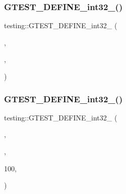 \mbox{\label{namespacetesting_aae6f1140f03d7bf24067df0f6628e9ea}} 
\subsubsection{\texorpdfstring{GTEST\_DEFINE\_int32\_()}{GTEST\_DEFINE\_int32\_()}\hspace{0.1cm}{\footnotesize\ttfamily [2/3]}}
{\footnotesize\ttfamily testing\+::\+G\+T\+E\+S\+T\+\_\+\+D\+E\+F\+I\+N\+E\+\_\+int32\+\_\+ (\begin{DoxyParamCaption}\item[{repeat}]{,  }\item[{\mbox{\hyperlink{namespacetesting_1_1internal_a0f7e728793f9e6cb0aa2b69eaa468bf3}{internal\+::\+Int32\+From\+G\+Test\+Env}}(\char`\"{}repeat\char`\"{}, 1)}]{,  }\item[{\char`\"{}How many times to repeat each test. Specify a negative number \char`\"{} \char`\"{}for repeating forever. Useful for shaking out flaky tests.\char`\"{}}]{ }\end{DoxyParamCaption})}

\mbox{\label{namespacetesting_a84af642630c9181f00fcf0a4a63e795e}} 
\subsubsection{\texorpdfstring{GTEST\_DEFINE\_int32\_()}{GTEST\_DEFINE\_int32\_()}\hspace{0.1cm}{\footnotesize\ttfamily [3/3]}}
{\footnotesize\ttfamily testing\+::\+G\+T\+E\+S\+T\+\_\+\+D\+E\+F\+I\+N\+E\+\_\+int32\+\_\+ (\begin{DoxyParamCaption}\item[{stack\+\_\+trace\+\_\+depth}]{,  }\item[{\mbox{\hyperlink{namespacetesting_1_1internal_a0f7e728793f9e6cb0aa2b69eaa468bf3}{internal\+::\+Int32\+From\+G\+Test\+Env}}(\char`\"{}stack\+\_\+trace\+\_\+depth\char`\"{}, k\+Max\+Stack\+Trace\+Depth)}]{,  }\item[{\char`\"{}The maximum number of stack frames to print when an \char`\"{} \char`\"{}assertion fails. The valid range is 0 through}]{100,  }\item[{inclusive.\char`\"{}}]{ }\end{DoxyParamCaption})}

